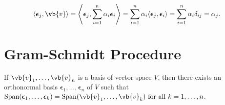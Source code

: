 \documentclass[a4paper,12pt]{report}
\begin{document}
\begin{equation}
\langle \boldsymbol{\epsilon}_j, \vb{v} \rangle = \left\langle \boldsymbol{\epsilon}_j, \sum_{i=1}^n \alpha_i \boldsymbol{\epsilon}_i \right\rangle = \sum_{i=1}^n \alpha_i \langle \boldsymbol{\epsilon}_j, \boldsymbol{\epsilon}_i \rangle = \sum_{i=1}^{n} \alpha_i \delta_{ij} = \alpha_j.
\end{equation}

\section{Gram-Schmidt Procedure}

\begin{theorem}
If \({\vb{v}_1, \ldots, \vb{v}_n }\) is a basis of vector space \(V\), then there exists an orthonormal basis \({\boldsymbol{\epsilon }_{1}, \ldots , \boldsymbol{\epsilon }_{n}    }\) of \(V\) such that \(\text{Span}(\boldsymbol{\epsilon }_{1}, \ldots ,\boldsymbol{\epsilon }_{k} ) = \text{Span}(\vb{v}_1, \ldots, \vb{v}_k ) \text{ for all } k = 1,\ldots ,n \).     
\end{theorem}
\end{document}
